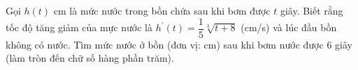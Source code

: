 \begin{ex}%
    Gọi $h(t)$ cm là mức nước trong bồn chứa sau khi bơm được $t$ giây. Biết rằng tốc độ tăng giảm của mực nước là $h^{\prime}(t)=\dfrac{1}{5} \sqrt[3]{t+8}$ (cm/s) và lúc đầu bồn không có nước. Tìm mức nước ở bồn (đơn vị: cm) sau khi bơm nước được $6$ giây (làm tròn đến chữ số hàng phần trăm).
\end{ex}

